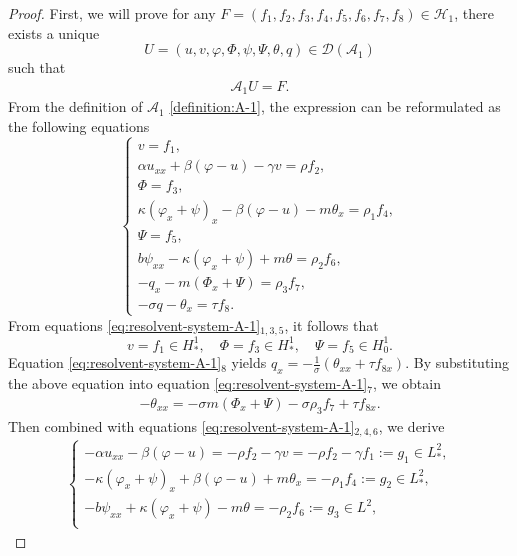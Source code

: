 \documentclass[10pt,a4paper]{amsart}
\begin{document}
\begin{proof}
	First, we will prove for any $F = (f_1,f_2,f_3,f_4,f_5,f_6,f_7,f_8) \in \mathcal{H}_1$, there exists a unique $$U = (u,v,\varphi,\Phi,\psi,\Psi,\theta,q)\in \mathcal{D}(\mathcal{A}_1)$$ such that \begin{align*}
		\mathcal{A}_1U = F.
	\end{align*}
	From the definition of $\mathcal{A}_1$ \eqref{definition:A-1}, the expression can be reformulated as the following equations
	\begin{equation}\label{eq:resolvent-system-A-1}
		\begin{cases}
			v = f_1, \\
			\alpha u_{xx} + \beta (\varphi - u) - \gamma v = \rho f_2, \\
			\Phi = f_3, \\
			\kappa (\varphi_x + \psi)_x - \beta (\varphi - u) - m \theta_x = \rho_1 f_4, \\
			\Psi = f_5, \\
			b \psi_{xx} - \kappa (\varphi_x + \psi) + m\theta = \rho_2 f_6, \\
			-q_x - m (\Phi_x + \Psi) = \rho_3 f_7, \\
			-\sigma q - \theta_x = \tau f_8.
		\end{cases}
	\end{equation}
	From equations \eqref{eq:resolvent-system-A-1}$_{1,3,5}$, it follows that
	\begin{equation}\label{df1}
		v = f_1 \in H_*^1, \quad \Phi = f_3 \in H_*^1, \quad \Psi = f_5 \in H_0^1.
	\end{equation}
	Equation \eqref{eq:resolvent-system-A-1}$_8$ yields
	$q_x=-\frac{1}{\sigma}(\theta_{xx}+\tau f_{8x}).$ By substituting the above equation into equation \eqref{eq:resolvent-system-A-1}$_7$, we obtain
	\begin{align*}
		- \theta_{xx} = - \sigma m(\Phi_x + \Psi) - \sigma \rho_3 f_7 + \tau f_{8x}.
	\end{align*}
	Then combined with equations \eqref{eq:resolvent-system-A-1}$_{2,4,6}$, we derive
	\begin{align}\label{eq:resolvent-system-1-A-1}
		\begin{cases}
			-\alpha u_{xx} - \beta(\varphi - u) = -\rho f_2 - \gamma v=-\rho f_2 - \gamma f_1 := g_1 \in L_*^2, \\
			-\kappa(\varphi_x + \psi)_x + \beta(\varphi - u) + m\theta_x = -\rho_1 f_4 := g_2 \in L_*^2, \\
			- b \psi_{xx} + \kappa(\varphi_x + \psi) - m\theta = -\rho_2 f_6  := g_3 \in L^2, \\

\end{cases}
\end{align}
\end{proof}
\end{document}
